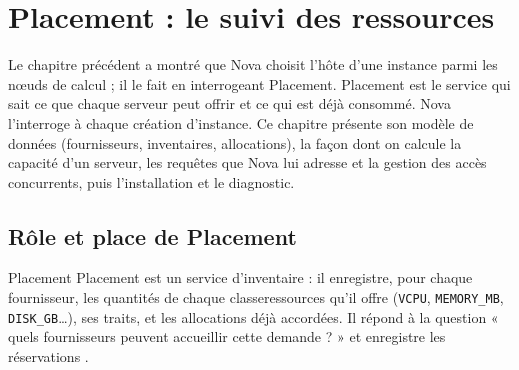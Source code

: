 
\section{Placement : le suivi des ressources}\label{chap:placement}

Le chapitre précédent a montré que Nova choisit l'hôte d'une instance parmi les nœuds de calcul ; il le fait en interrogeant
Placement. Placement est le service qui sait ce que chaque serveur peut offrir et ce qui est déjà consommé. Nova l'interroge à
chaque création d'instance. Ce chapitre présente son modèle de données (fournisseurs, inventaires, allocations), la façon dont
on calcule la capacité d'un serveur, les requêtes que Nova lui adresse et la gestion des accès concurrents, puis l'installation
et le diagnostic.

\subsection{Rôle et place de Placement}\label{sec:pl-role}

\begin{definition}{Placement}
Placement est un service d'inventaire : il enregistre, pour chaque \gls{fournisseur}, les quantités de chaque
\gls{classeressources} qu'il offre (\texttt{VCPU}, \texttt{MEMORY\_MB}, \texttt{DISK\_GB}\dots), ses \glspl{trait},
et les \glspl{allocation} déjà accordées. Il répond à la question « quels fournisseurs peuvent accueillir cette
demande ? » et enregistre les réservations \parencite{placement-user}.
\end{definition}

